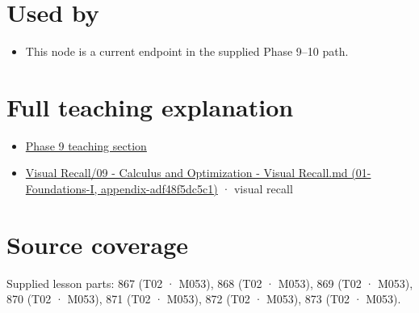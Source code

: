 \section{Used by}\label{appendix-54c8f5828387-used-by}

\begin{itemize}
\tightlist
\item
  This node is a current endpoint in the supplied Phase 9--10 path.
\end{itemize}

\section{Full teaching explanation}\label{appendix-54c8f5828387-full-teaching-explanation}

\begin{itemize}
\tightlist
\item
  \href{Continuous\%20Notes/Computing\%20Foundations\%20-\%20From\%20Bits\%20to\%20C++\%20and\%20Systems\%20APIs\#Optimization\%20and\%20inverse\%20problems}{Phase 9 teaching section}
\item
  \href{../01-Foundations-I/main.pdf\#nameddest=appendix-adf48f5dc5c1}{Visual Recall/09 - Calculus and Optimization - Visual Recall.md (01-Foundations-I, appendix-adf48f5dc5c1)} · visual recall
\end{itemize}

\section{Source coverage}\label{appendix-54c8f5828387-source-coverage}

Supplied lesson parts: 867 (T02 · M053), 868 (T02 · M053), 869 (T02 · M053), 870 (T02 · M053), 871 (T02 · M053), 872 (T02 · M053), 873 (T02 · M053).
